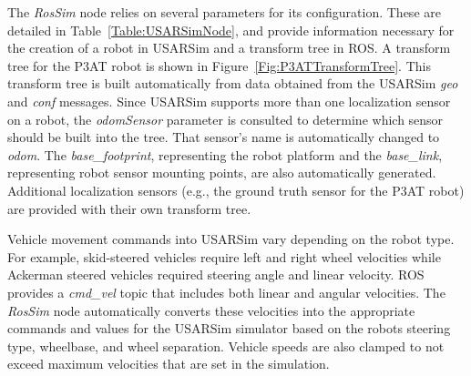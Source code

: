 The {\it RosSim} node relies on several parameters for its configuration. These are detailed in Table~\ref{Table:USARSimNode}, and provide information necessary for the creation of a robot in USARSim and a transform tree in ROS. A transform tree for the P3AT robot is shown in Figure~\ref{Fig:P3ATTransformTree}. This transform tree is built automatically from data obtained from the USARSim {\it geo} and {\it conf} messages. Since USARSim supports more than one localization sensor on a robot, the {\it odomSensor} parameter is consulted to determine which sensor should be built into the tree. That sensor's name is automatically changed to {\it odom}. The {\it base\_footprint}, representing the robot platform and the {\it base\_link}, representing robot sensor mounting points, are also automatically generated. Additional localization sensors (e.g., the ground truth sensor for the P3AT robot) are provided with their own transform tree.

Vehicle movement commands into USARSim vary depending on the robot type. For example, skid-steered vehicles require left and right wheel velocities while Ackerman steered vehicles required steering angle and linear velocity. ROS provides a {\it cmd\_vel} topic that includes both linear and angular velocities. The {\it RosSim} node automatically converts these velocities into the appropriate commands and values for the USARSim simulator based on the robots steering type, wheelbase, and wheel separation. Vehicle speeds are also clamped to not exceed maximum velocities that are set in the simulation.
